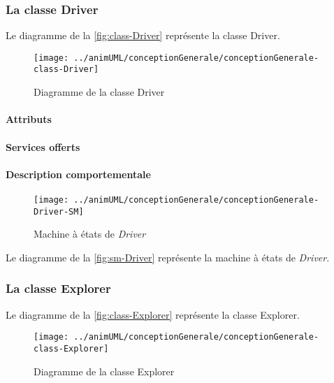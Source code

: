 \subsubsection{La classe Driver}

Le diagramme de la \autoref{fig:class-Driver} représente la classe Driver.
\begin{figure}[H]
	\centering
	\texttt{[image: ../animUML/conceptionGenerale/conceptionGenerale-class-Driver]}
	\caption{Diagramme de la classe Driver}
	\label{fig:class-Driver}
\end{figure}


\paragraph{Attributs}
\classDriverProperties
\paragraph{Services offerts}
\classDriverOperations
\paragraph{Description comportementale}
\begin{figure}[H]
	\centering
	\texttt{[image: ../animUML/conceptionGenerale/conceptionGenerale-Driver-SM]}
	\caption{Machine à états de \emph{Driver}}
	\label{fig:sm-Driver}
\end{figure}
Le diagramme de la \autoref{fig:sm-Driver} représente la machine à états de \emph{Driver}.

\subsubsection{La classe Explorer}

Le diagramme de la \autoref{fig:class-Explorer} représente la classe Explorer.
\begin{figure}[H]
	\centering
	\texttt{[image: ../animUML/conceptionGenerale/conceptionGenerale-class-Explorer]}
	\caption{Diagramme de la classe Explorer}
	\label{fig:class-Explorer}
\end{figure}


